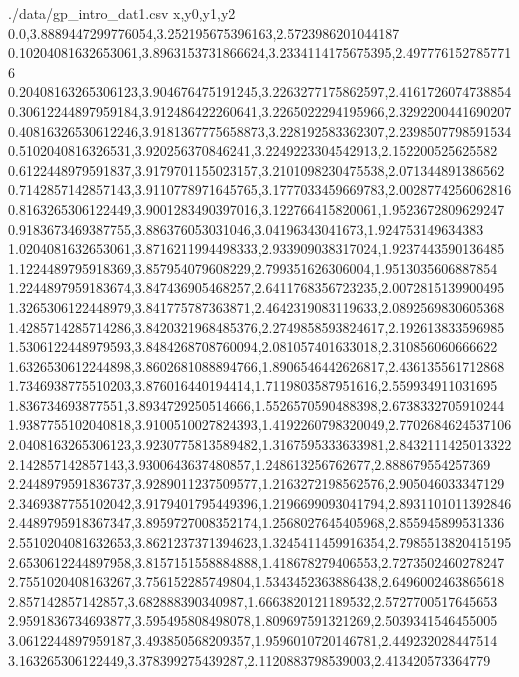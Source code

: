 \begin{filecontents*}{./data/gp_intro_dat1.csv}
    x,y0,y1,y2
    0.0,3.8889447299776054,3.252195675396163,2.5723986201044187
    0.10204081632653061,3.8963153731866624,3.2334114175675395,2.4977761527857716
    0.20408163265306123,3.904676475191245,3.2263277175862597,2.4161726074738854
    0.30612244897959184,3.912486422260641,3.2265022294195966,2.3292200441690207
    0.40816326530612246,3.9181367775658873,3.228192583362307,2.2398507798591534
    0.5102040816326531,3.920256370846241,3.2249223304542913,2.152200525625582
    0.6122448979591837,3.9179701155023157,3.2101098230475538,2.071344891386562
    0.7142857142857143,3.9110778971645765,3.1777033459669783,2.0028774256062816
    0.8163265306122449,3.9001283490397016,3.122766415820061,1.9523672809629247
    0.9183673469387755,3.886376053031046,3.04196343041673,1.924753149634383
    1.0204081632653061,3.8716211994498333,2.933909038317024,1.9237443590136485
    1.1224489795918369,3.857954079608229,2.799351626306004,1.9513035606887854
    1.2244897959183674,3.847436905468257,2.6411768356723235,2.0072815139900495
    1.3265306122448979,3.841775787363871,2.4642319083119633,2.0892569830605368
    1.4285714285714286,3.8420321968485376,2.2749858593824617,2.192613833596985
    1.5306122448979593,3.8484268708760094,2.081057401633018,2.310856060666622
    1.6326530612244898,3.8602681088894766,1.8906546442626817,2.436135561712868
    1.7346938775510203,3.876016440194414,1.7119803587951616,2.559934911031695
    1.836734693877551,3.8934729250514666,1.5526570590488398,2.6738332705910244
    1.9387755102040818,3.9100510027824393,1.4192260798320049,2.7702684624537106
    2.0408163265306123,3.9230775813589482,1.3167595333633981,2.8432111425013322
    2.142857142857143,3.9300643637480857,1.248613256762677,2.888679554257369
    2.2448979591836737,3.9289011237509577,1.2163272198562576,2.905046033347129
    2.3469387755102042,3.9179401795449396,1.2196699093041794,2.8931101011392846
    2.4489795918367347,3.8959727008352174,1.2568027645405968,2.855945899531336
    2.5510204081632653,3.8621237371394623,1.3245411459916354,2.7985513820415195
    2.6530612244897958,3.8157151558884888,1.418678279406553,2.7273502460278247
    2.7551020408163267,3.756152285749804,1.5343452363886438,2.6496002463865618
    2.857142857142857,3.682888390340987,1.6663820121189532,2.5727700517645653
    2.9591836734693877,3.595495808498078,1.809697591321269,2.5039341546455005
    3.0612244897959187,3.493850568209357,1.9596010720146781,2.449232028447514
    3.163265306122449,3.378399275439287,2.1120883798539003,2.413420573364779

\end{filecontents*}
